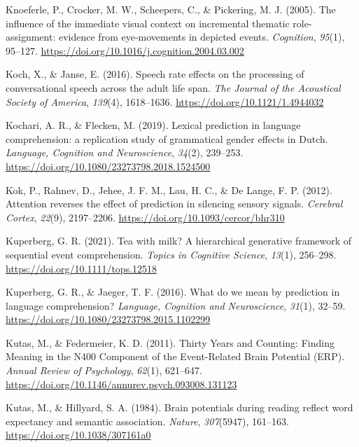 \documentclass[a4paper, nobind]{templates/ociamthesis}
\newlength{\cslhangindent}
\newenvironment{CSLReferences}[2] %
 {%
  \setlength{\parindent}{0pt}
  \ifodd #1
  \let\oldpar\par
  \def\par{\hangindent=\cslhangindent\oldpar}
  \fi
  \setlength{\parskip}{1mm}
  \setlength{\baselineskip}{6mm}
 }%
 {}
\begin{document}
\begin{CSLReferences}{1}{0}
\leavevmode{}%
Knoeferle, P., Crocker, M. W., Scheepers, C., \& Pickering, M. J. (2005). The influence of the immediate visual context on incremental thematic role-assignment: evidence from eye-movements in depicted events. \emph{Cognition}, \emph{95}(1), 95--127. \url{https://doi.org/10.1016/j.cognition.2004.03.002}

\leavevmode{}%
Koch, X., \& Janse, E. (2016). {Speech rate effects on the processing of conversational speech across the adult life span}. \emph{The Journal of the Acoustical Society of America}, \emph{139}(4), 1618--1636. \url{https://doi.org/10.1121/1.4944032}

\leavevmode{}%
Kochari, A. R., \& Flecken, M. (2019). {Lexical prediction in language comprehension: a replication study of grammatical gender effects in Dutch}. \emph{Language, Cognition and Neuroscience}, \emph{34}(2), 239--253. \url{https://doi.org/10.1080/23273798.2018.1524500}

\leavevmode{}%
Kok, P., Rahnev, D., Jehee, J. F. M., Lau, H. C., \& De Lange, F. P. (2012). {Attention reverses the effect of prediction in silencing sensory signals}. \emph{Cerebral Cortex}, \emph{22}(9), 2197--2206. \url{https://doi.org/10.1093/cercor/bhr310}

\leavevmode{}%
Kuperberg, G. R. (2021). {Tea with milk? A hierarchical generative framework of sequential event comprehension}. \emph{Topics in Cognitive Science}, \emph{13}(1), 256--298. \url{https://doi.org/10.1111/tops.12518}

\leavevmode{}%
Kuperberg, G. R., \& Jaeger, T. F. (2016). What do we mean by prediction in language comprehension? \emph{Language, Cognition and Neuroscience}, \emph{31}(1), 32--59. \url{https://doi.org/10.1080/23273798.2015.1102299}

\leavevmode{}%
Kutas, M., \& Federmeier, K. D. (2011). Thirty Years and Counting: Finding Meaning in the N400 Component of the Event-Related Brain Potential (ERP). \emph{Annual Review of Psychology}, \emph{62}(1), 621--647. \url{https://doi.org/10.1146/annurev.psych.093008.131123}

\leavevmode{}%
Kutas, M., \& Hillyard, S. A. (1984). Brain potentials during reading reflect word expectancy and semantic association. \emph{Nature}, \emph{307}(5947), 161--163. \url{https://doi.org/10.1038/307161a0}


\end{CSLReferences}
\end{document}
